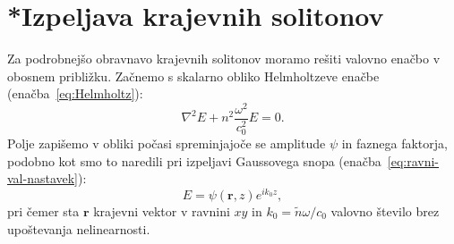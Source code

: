 \section{*Izpeljava krajevnih solitonov}
\label{chap:ks}
Za podrobnejšo obravnavo krajevnih solitonov moramo rešiti valovno 
enačbo v obosnem približku. Začnemo s skalarno obliko Helmholtzeve enačbe (enačba~\ref{eq:Helmholtz}):
\begin{equation}
\nabla^{2}E+n^{2}\frac{\omega^{2}}{c_0^{2}}E=0.
\label{8.80}
\end{equation}
Polje zapišemo v obliki počasi spreminjajoče se amplitude $\psi$ in faznega faktorja, 
podobno kot smo to naredili pri izpeljavi Gaussovega snopa (enačba~\ref{eq:ravni-val-nastavek}):
\begin{equation}
E=\psi(\mathbf{r},z)e^{ik_{0}z},
\label{8.81}
\end{equation}
pri čemer sta $\mathbf{r}$ krajevni vektor v ravnini $xy$ in $k_{0}=\tilde{n}\omega/c_0$ valovno število brez upoštevanja nelinearnosti.
 
